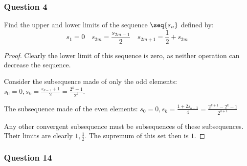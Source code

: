\documentclass[12pt, letterpaper]{paper}
\begin{document}
\subsubsection*{Question 4}

\begin{question}
  Find the upper and lower limits of the sequence $\seq{s_n}$ defined
  by:
  \begin{equation*}
    s_1 = 0 \quad s_{2m} = \frac{s_{2m-1}}{2} \quad s_{2m+1} = \frac{1}{2} + s_{2m}
  \end{equation*}
\end{question}
\begin{proof}
  Clearly the lower limit of this sequence is zero, as neither
  operation can decrease the sequence.

  Consider the subsequence made of only the odd elements:
  $s_0 = 0, s_k = \frac{s_{k-1}+1}{2} = \frac{2^k-1}{2^k}$.

  The subsequence made of the even elements:
  $s_0 = 0, s_k = \frac{1+2s_{k-1}}{4} =
  \frac{2^{k+1}-2^k-1}{2^{k+1}}$

  Any other convergent subsequence must be subsequences of these
  subsequences. Their limits are clearly $1, \frac{1}{2}$. The
  supremum of this set then is $1$.
\end{proof}

\subsubsection*{Question 14}
\end{document}
